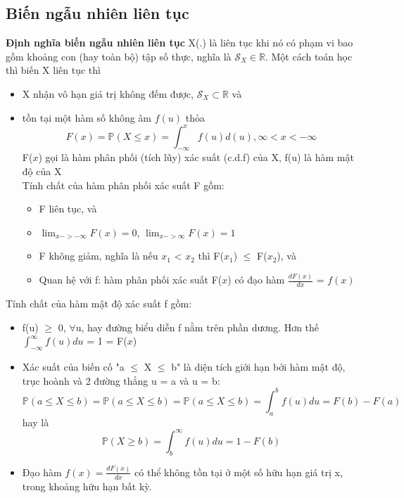 \documentclass[a4paper, 13pt]{report}
\begin{document}
\subsection*{Biến ngẫu nhiên liên tục}   
\textbf{Định nghĩa biến ngẫu nhiên liên tục} X(.) là liên tục khi nó có phạm vi bao gồm khoảng con (hay toàn bộ) tập số thực, nghĩa là $\mathcal{S}_X \in \mathbb{R}$. Một cách toán học thì biến X liên tục thì 
\begin{itemize}
\item X nhận vô hạn giá trị không đếm được, $\mathcal{S}_X \subset \mathbb{R}$ và 
\item tồn tại một hàm số không âm $f(u)$ thỏa
\[
F(x) = \mathbb{P}(X \leq x) = \int_{-\infty}^{x} f(u)d(u), \infty < x < -\infty 
\]
F($x$) gọi là hàm phân phối (tích lũy) xác suất (c.d.f) của X, f(u) là hàm mật độ của X\\
Tính chất của hàm phân phối xác suất F gồm:
\begin{itemize}
\item F liên tục, và
\item $\lim_{x->-\infty}F(x)=0$, $\lim_{x->\infty}F(x)=1$
\item F không giảm, nghĩa là nếu $x_1$ < $x_2$ thì F($x_1$) $\leq$ F($x_2$), và
\item Quan hệ với f: hàm phân phối xác suất F($x$) có đạo hàm $\frac{dF(x)}{dx}$ = $f(x)$   
\end{itemize}
\end{itemize}
Tính chất của hàm mật độ xác suất f gồm:
\begin{itemize}
\item f(u) $\geq$ 0, $\forall$u, hay đường biểu diễn f nằm trên phần dương. Hơn thế $\int_{-\infty}^{\infty} f(u)du$ = 1 = F($x$)
\item Xác suất của biến cố "a $\leq$ X $\leq$ b" là diện tích giới hạn bởi hàm mật độ, trục hoành và 2 đường thẳng u = a và u = b:
\[
\mathbb{P}(a \leq X \leq b) = \mathbb{P}(a \le X \le b) = \mathbb{P}(a \leq X \le b) = \int_{a}^{b} f(u)du = F(b) - F(a)
\] 
hay là 
\[
\mathbb{P}(X \geq b) = \int_{b}^{\infty} f(u)du = 1 - F(b)
\]
\item Đạo hàm $f(x) = \frac{dF(x)}{dx}$ có thể không tồn tại ở một số hữu hạn giá trị x, trong khoảng hữu hạn bất kỳ.   
\end{itemize}
\end{document}
